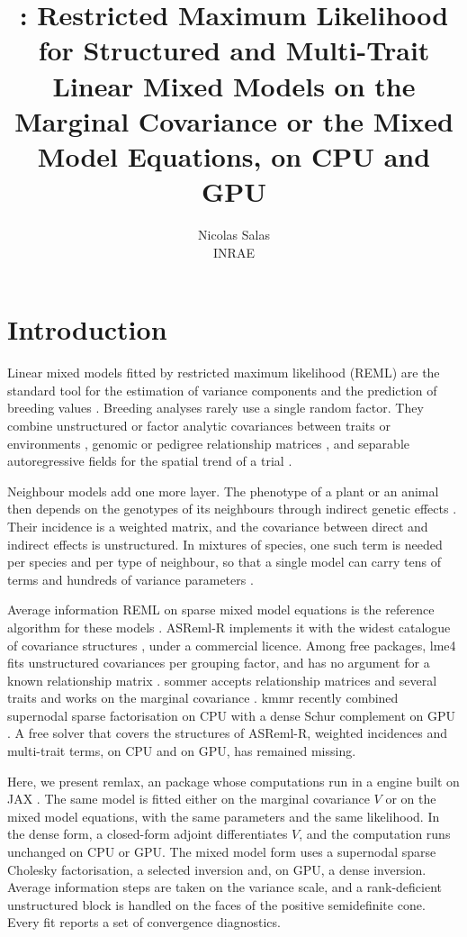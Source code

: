 \documentclass[article,nojss]{jss}
\author{Nicolas Salas\\INRAE}
\title{\pkg{remlax}: Restricted Maximum Likelihood for Structured and
  Multi-Trait Linear Mixed Models on the Marginal Covariance or the Mixed
  Model Equations, on CPU and GPU}
\renewcommand{\pkg}[1]{#1}
\begin{document}
\maketitle

\section{Introduction}\label{sec:intro}

Linear mixed models fitted by restricted maximum likelihood (REML) are the
standard tool for the estimation of variance components and the prediction of
breeding values \citep{patterson1971,henderson1975}. Breeding analyses rarely
use a single random factor. They combine unstructured or factor analytic
covariances between traits or environments \citep{smith2001}, genomic or
pedigree relationship matrices \citep{vanraden2008}, and separable
autoregressive fields for the spatial trend of a trial \citep{gilmour1997}.

Neighbour models add one more layer. The phenotype of a plant or an animal
then depends on the genotypes of its neighbours through indirect genetic
effects \citep{muir2005,bijma2007}. Their incidence is a
weighted matrix, and the covariance between direct and indirect effects is
unstructured. In mixtures of species, one such term is needed per species and
per type of neighbour, so that a single model can carry tens of terms and
hundreds of variance parameters \citep{salas2026}.

Average information REML on sparse mixed model equations is the reference
algorithm for these models \citep{gilmour1995,johnson1995}. \pkg{ASReml-R}
implements it with the widest catalogue of covariance structures
\citep{butler2023}, under a commercial licence. Among free packages,
\pkg{lme4} fits unstructured covariances per grouping factor, and has no
argument for a known relationship matrix \citep{lme4}. \pkg{sommer} accepts relationship matrices
and several traits and works on the marginal covariance
\citep{sommer}. \pkg{kmmr} recently combined supernodal sparse factorisation
on CPU with a dense Schur complement on GPU \citep{melsen2026}. A free solver
that covers the structures of \pkg{ASReml-R}, weighted incidences and
multi-trait terms, on CPU and on GPU, has remained missing.

Here, we present \pkg{remlax}, an  package whose computations run
in a  engine built on \pkg{JAX} \citep{jax2018}. The same
model is fitted either on the marginal covariance $V$ or on the mixed model
equations, with the same parameters and the same likelihood. In the dense
form, a closed-form adjoint differentiates $V$, and the computation runs
unchanged on CPU or GPU. The mixed model form uses a supernodal sparse Cholesky factorisation, a
selected inversion and, on GPU, a dense inversion. Average information steps
are taken on the variance scale, and a rank-deficient unstructured block is
handled on the faces of the positive semidefinite cone. Every fit reports a
set of convergence diagnostics.
\end{document}
